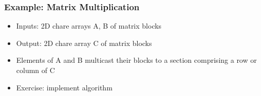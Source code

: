 \begin{frame}[fragile]
\frametitle{Example: Matrix Multiplication}
\begin{itemize}
\item Inputs: 2D chare arrays A, B of matrix blocks
\item Output: 2D chare array C of matrix blocks
\item Elements of A and B multicast their blocks to a section comprising a row
  or column of C
\item Exercise: implement algorithm
\end{itemize}
\end{frame}